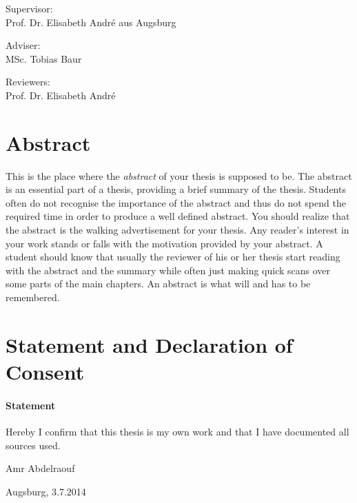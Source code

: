 \documentclass[12pt, a4paper, fleqn]{memoir}%
\begin{document}
\vspace{2.0em}
\begin{center}
    \normalsize
    Supervisor:\\ 
    Prof. Dr. Elisabeth Andr\'{e} aus Augsburg
\end{center}
\begin{center}
    \normalsize
    Adviser:\\
    MSc. Tobias Baur
\end{center}
\begin{center}
    \normalsize
    Reviewers:\\
    Prof. Dr. Elisabeth Andr\'{e}\\
\end{center}
\cleardoublepage

\chapter*{Abstract}
This is the place where the \textit{abstract} of your thesis is supposed to be. The abstract is an essential part of a thesis, providing a brief summary of the thesis. Students often do not recognise the importance of the abstract and thus do not spend the required time in order to produce a well defined abstract. You should realize that the abstract is the walking advertisement for your thesis. Any reader's interest in your work stands or falls with the motivation provided by your abstract. A student should know that usually the reviewer of his or her thesis start reading with the abstract and the summary while often just making quick scans over some parts of the main chapters. An abstract is what will and has to be remembered.

\chapter*{Statement and Declaration of Consent}
\vfill
\subsubsection*{\LARGE Statement}
Hereby I confirm that this thesis is my own work and that I have documented all sources used.
\vfill
\begin{flushleft}
Amr Abdelraouf
\end{flushleft}  
\begin{flushright}
Augsburg, 3.7.2014 
\end{flushright}
\vfill
\vfill
\end{document}
